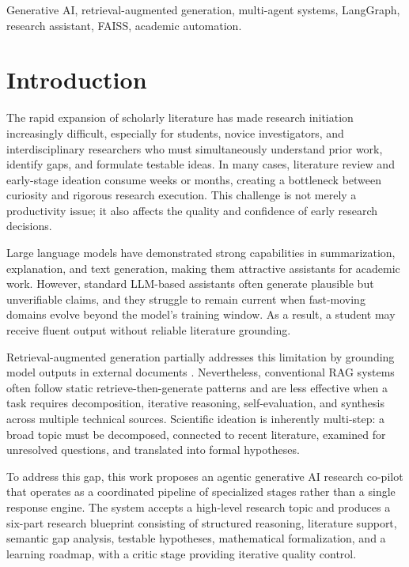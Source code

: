 \documentclass[conference]{IEEEtran}
\begin{document}
\begin{IEEEkeywords}
Generative AI, retrieval-augmented generation, multi-agent systems, LangGraph, research assistant, FAISS, academic automation.
\end{IEEEkeywords}

\section{Introduction}
The rapid expansion of scholarly literature has made research initiation increasingly difficult, especially for students, novice investigators, and interdisciplinary researchers who must simultaneously understand prior work, identify gaps, and formulate testable ideas. In many cases, literature review and early-stage ideation consume weeks or months, creating a bottleneck between curiosity and rigorous research execution. This challenge is not merely a productivity issue; it also affects the quality and confidence of early research decisions.

Large language models have demonstrated strong capabilities in summarization, explanation, and text generation, making them attractive assistants for academic work. However, standard LLM-based assistants often generate plausible but unverifiable claims, and they struggle to remain current when fast-moving domains evolve beyond the model's training window. As a result, a student may receive fluent output without reliable literature grounding.

Retrieval-augmented generation partially addresses this limitation by grounding model outputs in external documents \cite{lewis2020rag}. Nevertheless, conventional RAG systems often follow static retrieve-then-generate patterns and are less effective when a task requires decomposition, iterative reasoning, self-evaluation, and synthesis across multiple technical sources. Scientific ideation is inherently multi-step: a broad topic must be decomposed, connected to recent literature, examined for unresolved questions, and translated into formal hypotheses.

To address this gap, this work proposes an agentic generative AI research co-pilot that operates as a coordinated pipeline of specialized stages rather than a single response engine. The system accepts a high-level research topic and produces a six-part research blueprint consisting of structured reasoning, literature support, semantic gap analysis, testable hypotheses, mathematical formalization, and a learning roadmap, with a critic stage providing iterative quality control.
\end{document}
